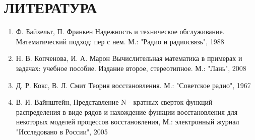\chapter*{ЛИТЕРАТУРА}
\begin{enumerate}
\item  Ф. Байхельт, П. Франкен Надежность и техническое обслуживание. Математический подход: пер с нем. М.: "Радио и радиосвязь", 1988
\item Н. В. Копченова, И. А. Марон Вычислительная математика в примерах и задачах: учебное пособие. Издание второе, стереотипное. М.: "Лань", 2008
\item Д. Р. Кокс, В. Л. Смит Теория восстановления. М.: "Советское радио", 1967
\item В. И. Вайнштейн, Представление N - кратных сверток функций распределения в виде рядов и нахождение функции восстановления для некоторых
моделей процессов восстановления, М.: электронный журнал "Исследовано в России", 2005
\end{enumerate}